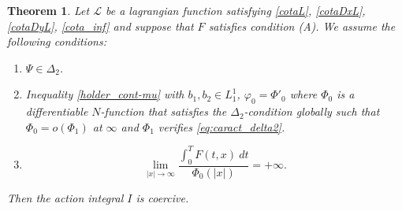 \documentclass[twoside]{article}
\newtheorem{thm}{Theorem}[section]
\theoremstyle{remark}
\begin{document}
\begin{thm}\label{coercitividad-r}
Let  $\mathcal{L}$ be a lagrangian function satisfying \eqref{cotaL}, \eqref{cotaDxL}, \eqref{cotaDyL}, \eqref{cota_inf}  and suppose that $F$ satisfies condition (A). We assume the following conditions:
\begin{enumerate}
\item $\Psi\in\Delta_2$.
\item Inequality \eqref{holder_cont-mu} with $b_1,b_2 \in L^1_1$,  $\varphi_0=\Phi'_0$ where $\Phi_0$ is a differentiable $N$-function that satisfies the $\Delta_2$-condition globally such that
$\Phi_0=o(\Phi_1)$ at $\infty$ and $\Phi_1$ verifies \eqref{eq:caract_delta2}.
\item 
\begin{equation}\label{eq:propiedad-coercividad-phi0}
\lim_{|x|\to\infty}\frac{\int_{0}^{T}F(t,x)\ dt}{\Phi_0(|x|)}=+\infty.
\end{equation}
\end{enumerate}
Then  the action integral $I$ is coercive.
\end{thm}
\end{document}
